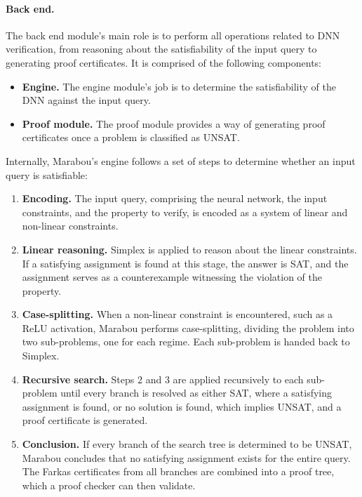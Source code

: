\paragraph*{Back end.} The back end module's main role is to perform all operations related to DNN verification, from reasoning about the satisfiability of the input query to generating proof certificates. It is comprised of the following components:
\begin{itemize}
    \item \textbf{Engine.} The engine module's job is to determine the satisfiability of the DNN against the input query.
    \item \textbf{Proof module.} The proof module provides a way of generating proof certificates once a problem is classified as UNSAT.
\end{itemize}

\vspace{0.5cm}

Internally, Marabou's engine follows a set of steps to determine
whether an input query is satisfiable:

\begin{enumerate}
    \item \textbf{Encoding.} The input query, comprising the neural network, the input constraints, and the property to verify, is encoded as a system of linear and non-linear constraints.
    \item \textbf{Linear reasoning.} Simplex \cite{calculus_of_computation} is applied to reason about the linear constraints. If a satisfying assignment is found at this stage, the answer is SAT, and the assignment serves as a counterexample witnessing the violation of the property.
    \item \textbf{Case-splitting.} When a non-linear constraint is encountered, such as a ReLU activation, Marabou performs case-splitting, dividing the problem into two sub-problems, one for each regime. Each sub-problem is handed back to Simplex.
    \item \textbf{Recursive search.} Steps 2 and 3 are applied recursively to each sub-problem until every branch is resolved as either SAT, where a satisfying assignment is found, or no solution is found, which implies UNSAT, and a proof certificate is generated.
    \item \textbf{Conclusion.} If every branch of the search tree is determined to be UNSAT, Marabou concludes that no satisfying assignment exists for the entire query. The Farkas certificates from all branches are combined into a proof tree, which a proof checker can then validate.
\end{enumerate}

